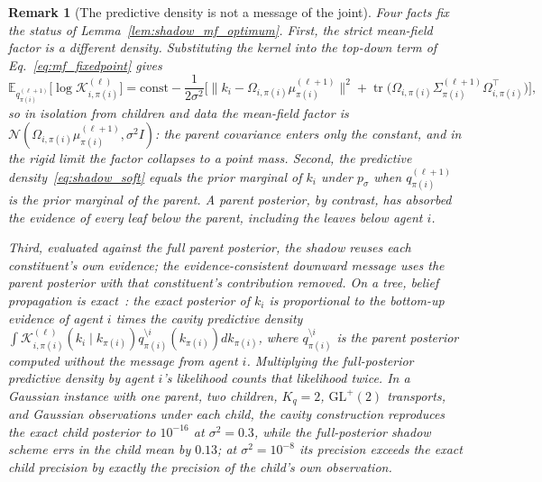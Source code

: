 \documentclass[11pt]{article}
\newtheorem{remark}{Remark}
\begin{document}
\begin{remark}[The predictive density is not a message of the joint]
\label{rem:shadow_marginal_vs_mf}
Four facts fix the status of Lemma~\ref{lem:shadow_mf_optimum}. First, the strict mean-field factor is a different density. Substituting the kernel into the top-down term of Eq.~\eqref{eq:mf_fixedpoint} gives
\[
\mathbb{E}_{q_{\pi(i)}^{(\ell+1)}}\big[\log \mathcal{K}_{i,\pi(i)}^{(\ell)}\big] = \text{const} - \frac{1}{2\sigma^2}\Big[\big\|k_i - \Omega_{i,\pi(i)}\mu_{\pi(i)}^{(\ell+1)}\big\|^2 + \operatorname{tr}\big(\Omega_{i,\pi(i)}\Sigma_{\pi(i)}^{(\ell+1)}\Omega_{i,\pi(i)}^\top\big)\Big],
\]
so in isolation from children and data the mean-field factor is $\mathcal{N}(\Omega_{i,\pi(i)}\mu_{\pi(i)}^{(\ell+1)}, \sigma^2 I)$: the parent covariance enters only the constant, and in the rigid limit the factor collapses to a point mass. Second, the predictive density~\eqref{eq:shadow_soft} equals the prior marginal of $k_i$ under $p_\sigma$ when $q_{\pi(i)}^{(\ell+1)}$ is the prior marginal of the parent. A parent posterior, by contrast, has absorbed the evidence of every leaf below the parent, including the leaves below agent $i$.

Third, evaluated against the full parent posterior, the shadow reuses each constituent's own evidence; the evidence-consistent downward message uses the parent posterior with that constituent's contribution removed. On a tree, belief propagation is exact~\cite[\S8.4]{Bishop2006}: the exact posterior of $k_i$ is proportional to the bottom-up evidence of agent $i$ times the cavity predictive density $\int \mathcal{K}_{i,\pi(i)}^{(\ell)}(k_i \mid k_{\pi(i)}) q_{\pi(i)}^{\setminus i}(k_{\pi(i)}) dk_{\pi(i)}$, where $q_{\pi(i)}^{\setminus i}$ is the parent posterior computed without the message from agent $i$. Multiplying the full-posterior predictive density by agent $i$'s likelihood counts that likelihood twice. In a Gaussian instance with one parent, two children, $K_q = 2$, $\mathrm{GL}^+(2)$ transports, and Gaussian observations under each child, the cavity construction reproduces the exact child posterior to $10^{-16}$ at $\sigma^2 = 0.3$, while the full-posterior shadow scheme errs in the child mean by $0.13$; at $\sigma^2 = 10^{-8}$ its precision exceeds the exact child precision by exactly the precision of the child's own observation.


\end{remark}
\end{document}
